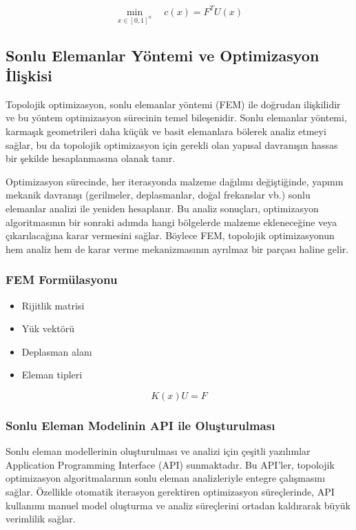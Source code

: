 \begin{equation}
\min_{x \in [0,1]^n} \quad c(x) = F^T U(x)
\end{equation}

\subsection{Sonlu Elemanlar Yöntemi ve Optimizasyon İlişkisi}
Topolojik optimizasyon, sonlu elemanlar yöntemi (FEM) ile doğrudan ilişkilidir ve bu yöntem optimizasyon sürecinin temel bileşenidir. Sonlu elemanlar yöntemi, karmaşık geometrileri daha küçük ve basit elemanlara bölerek analiz etmeyi sağlar, bu da topolojik optimizasyon için gerekli olan yapısal davranışın hassas bir şekilde hesaplanmasına olanak tanır.

Optimizasyon sürecinde, her iterasyonda malzeme dağılımı değiştiğinde, yapının mekanik davranışı (gerilmeler, deplasmanlar, doğal frekanslar vb.) sonlu elemanlar analizi ile yeniden hesaplanır. Bu analiz sonuçları, optimizasyon algoritmasının bir sonraki adımda hangi bölgelerde malzeme ekleneceğine veya çıkarılacağına karar vermesini sağlar. Böylece FEM, topolojik optimizasyonun hem analiz hem de karar verme mekanizmasının ayrılmaz bir parçası haline gelir.

\subsubsection{FEM Formülasyonu}
\begin{itemize}
    \item Rijitlik matrisi
    \item Yük vektörü
    \item Deplasman alanı
    \item Eleman tipleri
\end{itemize}

\begin{equation}
K(x)U = F
\end{equation}

\subsubsection{Sonlu Eleman Modelinin API ile Oluşturulması}
Sonlu eleman modellerinin oluşturulması ve analizi için çeşitli yazılımlar Application Programming Interface (API) sunmaktadır. Bu API'ler, topolojik optimizasyon algoritmalarının sonlu eleman analizleriyle entegre çalışmasını sağlar. Özellikle otomatik iterasyon gerektiren optimizasyon süreçlerinde, API kullanımı manuel model oluşturma ve analiz süreçlerini ortadan kaldırarak büyük verimlilik sağlar.

